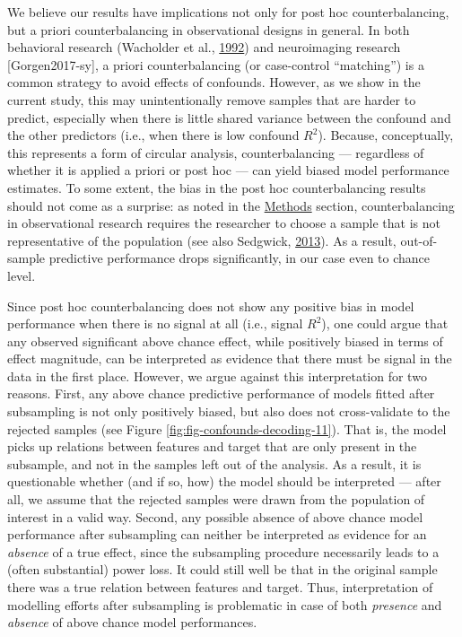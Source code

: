 \documentclass[11pt,american,]{memoir} %
\begin{document}
We believe our results have implications not only for post hoc counterbalancing, but a priori counterbalancing in observational designs in general. In both behavioral research (Wacholder et al., \protect\hyperlink{ref-Wacholder1992-wb}{1992}) and neuroimaging research {[}Gorgen2017-sy{]}, a priori counterbalancing (or case-control ``matching'') is a common strategy to avoid effects of confounds. However, as we show in the current study, this may unintentionally remove samples that are harder to predict, especially when there is little shared variance between the confound and the other predictors (i.e., when there is low confound \(R^2\)). Because, conceptually, this represents a form of circular analysis, counterbalancing --- regardless of whether it is applied a priori or post hoc --- can yield biased model performance estimates. To some extent, the bias in the post hoc counterbalancing results should not come as a surprise: as noted in the \protect\hyperlink{confounds-decoding-methods}{Methods} section, counterbalancing in observational research requires the researcher to choose a sample that is not representative of the population (see also Sedgwick, \protect\hyperlink{ref-Sedgwick2013-op}{2013}). As a result, out-of-sample predictive performance drops significantly, in our case even to chance level.

Since post hoc counterbalancing does not show any positive bias in model performance when there is no signal at all (i.e., signal \(R^2\)), one could argue that any observed significant above chance effect, while positively biased in terms of effect magnitude, can be interpreted as evidence that there must be signal in the data in the first place. However, we argue against this interpretation for two reasons. First, any above chance predictive performance of models fitted after subsampling is not only positively biased, but also does not cross-validate to the rejected samples (see Figure \ref{fig:fig-confounds-decoding-11}). That is, the model picks up relations between features and target that are only present in the subsample, and not in the samples left out of the analysis. As a result, it is questionable whether (and if so, how) the model should be interpreted --- after all, we assume that the rejected samples were drawn from the population of interest in a valid way. Second, any possible absence of above chance model performance after subsampling can neither be interpreted as evidence for an \emph{absence} of a true effect, since the subsampling procedure necessarily leads to a (often substantial) power loss. It could still well be that in the original sample there was a true relation between features and target. Thus, interpretation of modelling efforts after subsampling is problematic in case of both \emph{presence} and \emph{absence} of above chance model performances.
\end{document}
